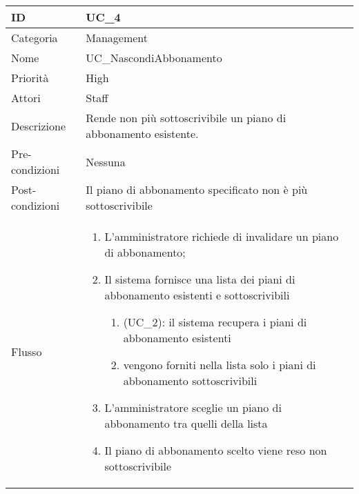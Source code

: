 \begin{center}
\begin{tabular}{ |p{2cm}|p{13cm}|  }
\hline
ID & UC\_4 \\\hline
Categoria & Management\\\hline
Nome & UC\_NascondiAbbonamento\\\hline
Priorità & High \\\hline
Attori &  Staff \\\hline
Descrizione & Rende non più sottoscrivibile un piano di abbonamento esistente.\\\hline
Pre-condizioni &  Nessuna \\\hline
Post-condizioni &  Il piano di abbonamento specificato non è più sottoscrivibile\\\hline
Flusso &  	\begin{enumerate}
		\item L'amministratore richiede di invalidare un piano di abbonamento;
		\item Il sistema fornisce una lista dei piani di abbonamento esistenti e sottoscrivibili
			\begin{enumerate}[  ]
			\item (UC\_2): il sistema recupera i piani di abbonamento esistenti
			\item vengono forniti nella lista solo i piani di abbonamento sottoscrivibili
			\end{enumerate}
		\item L'amministratore sceglie un piano di abbonamento tra quelli della lista
		\item Il piano di abbonamento scelto viene reso non sottoscrivibile
		\end{enumerate}\\\hline
\end{tabular}
\label{table_use_case:4}\newline


\end{center}
